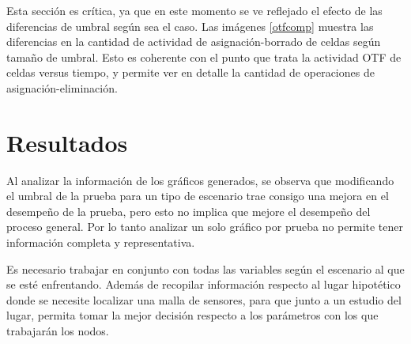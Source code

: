     Esta sección es crítica, ya que en este momento se ve reflejado el efecto de las diferencias de umbral según sea el caso. Las imágenes \ref{otfcomp} muestra las diferencias en la cantidad de actividad de asignación-borrado de celdas según tamaño de umbral. Esto es coherente con el punto que trata la actividad OTF de celdas versus tiempo, y permite ver en detalle la cantidad de operaciones de asignación-eliminación.
    


\section{Resultados}
    
Al analizar la información de los gráficos generados, se observa que modificando el umbral de la prueba para un tipo de escenario trae consigo una mejora en el desempeño de la prueba, pero esto no implica que mejore el desempeño del proceso general. Por lo tanto analizar un solo gráfico por prueba no permite tener información completa y representativa.

Es necesario trabajar en conjunto con todas las variables según el escenario al que se esté enfrentando. Además de recopilar información respecto al lugar hipotético donde se necesite localizar una malla de sensores, para que junto a un estudio del lugar, permita tomar la mejor decisión respecto a los parámetros con los que trabajarán los nodos.
